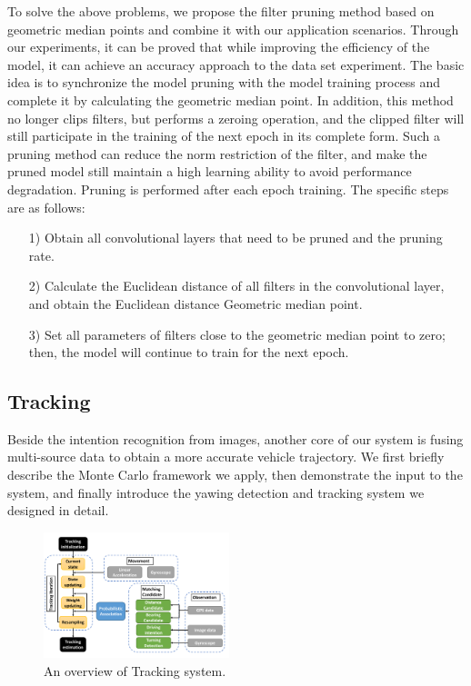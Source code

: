 \documentclass[journal]{IEEEtran}
\begin{document}
To solve the above problems, we propose the filter pruning method based on geometric median points and combine it with our application scenarios. Through our experiments, it can be proved that while improving the efficiency of the model, it can achieve an accuracy approach to the data set experiment. The basic idea is to synchronize the model pruning with the model training process and complete it by calculating the geometric median point. In addition, this method no longer clips filters, but performs a zeroing operation, and the clipped filter will still participate in the training of the next epoch in its complete form. Such a pruning method can reduce the norm restriction of the filter, and make the pruned model still maintain a high learning ability to avoid performance degradation. Pruning is performed after each epoch training. The specific steps are as follows: 
\begin{itemize}
  \item [1)] 
  Obtain all convolutional layers that need to be pruned and the pruning rate.       
  \item [2)]
  Calculate the Euclidean distance of all filters in the convolutional layer, and obtain the Euclidean distance Geometric median point. 
  \item [3)]
  Set all parameters of filters close to the geometric median point to zero; then, the model will continue to train for the next epoch.
\end{itemize}

\subsection{Tracking}\label{sec:tracking}
Beside the intention recognition from images, another core of our system is fusing multi-source data\cite{hostettler2014vehicle} to obtain a more accurate vehicle trajectory. We first briefly describe the Monte Carlo framework we apply, then demonstrate the input to the system, and finally introduce the yawing detection and tracking system we designed in detail.

\begin{figure}[htbp]
    \centerline{\includegraphics[width=0.48\textwidth]{fig/PF-Systemoverall.pdf}}
    \caption{An overview of Tracking system.}
    \label{fig:track_system}
\end{figure}
\end{document}
